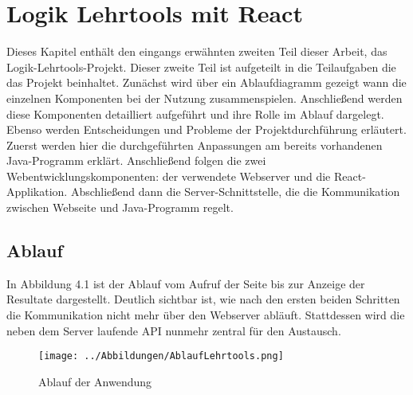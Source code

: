 
\chapter{Logik Lehrtools mit React}\label{Lehrtools}
Dieses Kapitel enthält den eingangs erwähnten zweiten Teil dieser Arbeit, das Logik-Lehrtools-Projekt. Dieser zweite Teil ist aufgeteilt in die Teilaufgaben die das Projekt beinhaltet. Zunächst wird über ein Ablaufdiagramm gezeigt wann die einzelnen Komponenten bei der Nutzung zusammenspielen. Anschließend werden diese Komponenten detailliert aufgeführt und ihre Rolle im Ablauf dargelegt. Ebenso werden Entscheidungen und Probleme der Projektdurchführung erläutert. Zuerst werden hier die durchgeführten Anpassungen am bereits vorhandenen Java-Programm erklärt. Anschließend folgen die zwei Webentwicklungskomponenten: der verwendete Webserver und die React-Applikation. Abschließend dann die Server-Schnittstelle, die die Kommunikation zwischen Webseite und Java-Programm regelt.
\pagebreak
\section{Ablauf}
In Abbildung 4.1 ist der Ablauf vom Aufruf der Seite bis zur Anzeige der Resultate dargestellt. Deutlich sichtbar ist, wie nach den ersten beiden Schritten die Kommunikation nicht mehr über den Webserver abläuft. Stattdessen wird die neben dem Server laufende API nunmehr zentral für den Austausch.
\begin{figure}[H]
     \centerline{\texttt{[image: ../Abbildungen/AblaufLehrtools.png]}}
  \caption{Ablauf der Anwendung}
  \label{fig1_1}
\end{figure}
